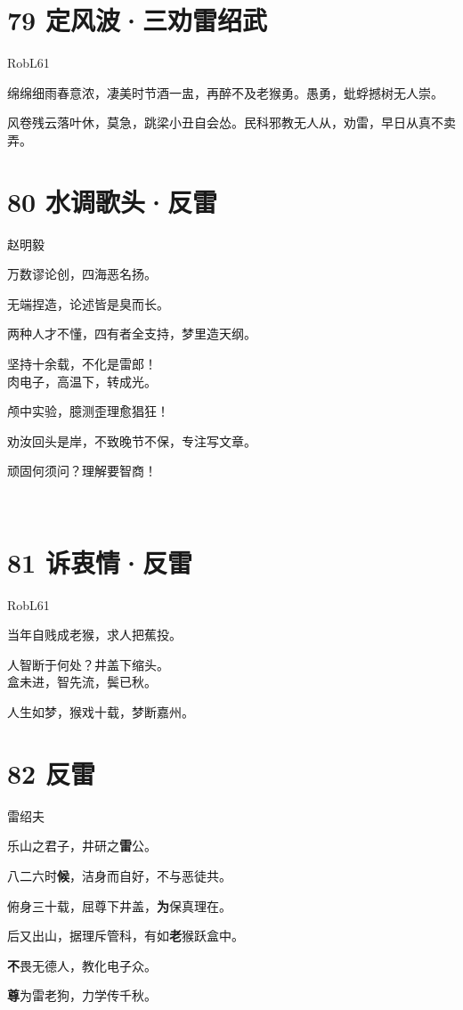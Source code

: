 \documentclass[UTF8,12pt,oneside]{ctexbook}
\def\pau#1{\begin{center} {#1} \end{center}} %
\def\poem#1#2{\section{#1}\pau{#2}} %
\def\lid{\setlength\parindent{5em}}
\def\lidlid{\setlength\parindent{8em}}
\def\lidend{\setlength\parindent{2em}}
\begin{document}
    \poem{79 定风波·三劝雷绍武}{RobL61}

    绵绵细雨春意浓，凄美时节酒一盅，再醉不及老猴勇。愚勇，蚍蜉撼树无人崇。 

    风卷残云落叶休，莫急，跳梁小丑自会怂。民科邪教无人从，劝雷，早日从真不卖弄。 
    
    \newpage
    
    \poem{80 水调歌头·反雷}{赵明毅}
    
     \lid
       万数谬论创，四海恶名扬。
       
       无端捏造，论述皆是臭而长。
       
       两种人才不懂，四有者全支持，梦里造天纲。
       
       坚持十余载，不化是雷郎！ 
       ~\\

       肉电子，高温下，转成光。
       
       颅中实验，臆测歪理愈猖狂！
       
       劝汝回头是岸，不致晚节不保，专注写文章。
       
       顽固何须问？理解要智商！
       
    \lidend
      
      ~\\
      
    \poem{81 诉衷情·反雷}{RobL61}
    \lidlid
    
        当年自贱成老猴，求人把蕉投。
        
        人智断于何处？井盖下缩头。 
        ~\\
        
        盒未进，智先流，鬓已秋。
        
        人生如梦，猴戏十载，梦断嘉州。
    
    \lidend
        
    \newpage

    \poem{82 反雷}{雷绍夫}
     \setlength\parindent{6em}
     
         乐山之君子，井研之\textbf{雷}公。
         
         八二六时\textbf{候}，洁身而自好，不与恶徒共。
         
         俯身三十载，屈尊下井盖，\textbf{为}保真理在。 
         
         后又出山，据理斥管科，有如\textbf{老}猴跃盒中。
         
         \textbf{不}畏无德人，教化电子众。
         
         \textbf{尊}为雷老狗，力学传千秋。
         
\end{document}
